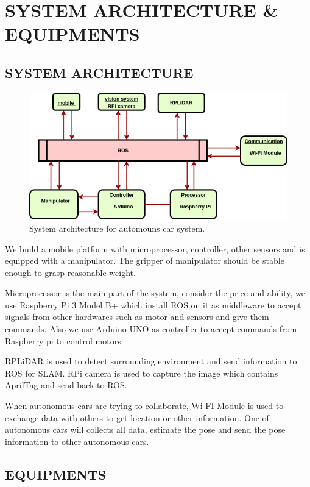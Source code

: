 \documentclass[a4paper, 10pt, conference]{ieeeconf}      %
\begin{document}
\section{SYSTEM ARCHITECTURE \& EQUIPMENTS}
\subsection{SYSTEM ARCHITECTURE}

\begin{figure}[h]
\includegraphics[width=0.95\columnwidth]{system_architecture}
\centering
\caption{System architecture for automouns car system.}
\end{figure}

We build a mobile platform with microprocessor, controller, other sensors and is equipped with a manipulator. The gripper of manipulator should be stable enough to grasp reasonable weight. 

Microprocessor is the main part of the system, consider the price and ability, we use Raspberry Pi 3 Model B+ which install ROS on it as middleware to accept signals from other hardwares such as motor and sensors and give them commands. Also we use Arduino UNO as controller to accept commands from Raspberry pi to control motors.

RPLiDAR is used to detect surrounding environment and send information to ROS for SLAM. RPi camera is used to capture the image which contains AprilTag and send back to ROS.

When autonomous cars are trying to collaborate, Wi-FI Module is used to exchange data with others to get location or other information. One of  autonomous cars will collects all data, estimate the pose and send the pose information to other autonomous cars.



\subsection{EQUIPMENTS} 
\end{document}

